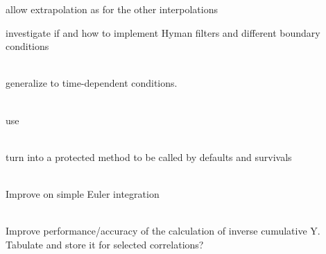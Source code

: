 \begin{DoxyRefList}
\begin{DoxyItemize}
\item allow extrapolation as for the other interpolations
\item investigate if and how to implement Hyman filters and different boundary conditions
\end{DoxyItemize}
\item[Class \doxylink{class_quant_lib_1_1_neumann_b_c}{Quant\+Lib\+::Neumann\+BC} ]\hfill \\
\label{todo__todo000053}%
%
generalize to time-\/dependent conditions. 
\item[Member \doxylink{class_quant_lib_1_1_nothing_exercise_value_a7ff3910063d6be59c728c489400af692}{Quant\+Lib\+::Nothing\+Exercise\+Value\+::Nothing\+Exercise\+Value} (const std\+::vector$<$ Time $>$ \&rate\+Times, std\+::valarray$<$ bool $>$ is\+Exercise\+Time=std\+::valarray$<$ bool $>$())]\hfill \\
\label{todo__todo000058}%
%
use   
\item[Member \doxylink{class_quant_lib_1_1_one_factor_affine_survival_structure_ad9c3edf4f4cfec799108a4f954c22d2c}{Quant\+Lib\+::One\+Factor\+Affine\+Survival\+Structure\+::conditional\+Survival\+Probability} (const \doxylink{class_quant_lib_1_1_date}{Date} \&d\+Fwd, const \doxylink{class_quant_lib_1_1_date}{Date} \&d\+Tgt, \doxylink{namespace_quant_lib_a372ac5c1a422a6b276fe0552d4d83f50}{Real} y\+Val, bool extrapolate=false) const]\hfill \\
\label{todo__todo000015}%
%
turn into a protected method to be called by defaults and survivals  
\item[Class \doxylink{class_quant_lib_1_1_one_factor_copula}{Quant\+Lib\+::One\+Factor\+Copula} ]\hfill \\
\label{todo__todo000016}%
%
Improve on simple Euler integration  
\item[Class \doxylink{class_quant_lib_1_1_one_factor_gaussian_student_copula}{Quant\+Lib\+::One\+Factor\+Gaussian\+Student\+Copula} ]\hfill \\
\label{todo__todo000018}%
%
Improve performance/accuracy of the calculation of inverse cumulative Y. Tabulate and store it for selected correlations?  
\item[Class \doxylink{class_quant_lib_1_1_one_factor_student_copula}{Quant\+Lib\+::One\+Factor\+Student\+Copula} ]\hfill \\

\end{DoxyRefList}
